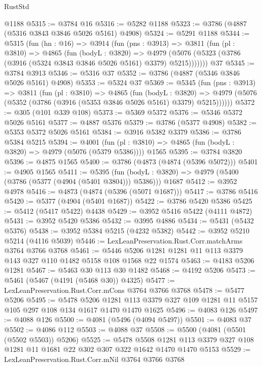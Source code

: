 \begin{lexlean}{RustStd}
\begin{coremodule}
    @1188
@5315 := @3784 @16
@5316 := @5282 @1188
@5323 := @3786 (@4887 (@5316 @3843 @3846 @5026 @5161) @4908)
@5324 := @5291 @1188
@5344 := @5315
    (fun (hn : @16) =>
    @3914
      (fun (pns : @3913) =>
      @3811
        (fun (pl : @3810) =>
        @4865
          (fun (bodyL : @3820) =>
          @4979 (@5076 (@5323 (@3786 (@3916 (@5324 @3843 @3846 @5026 @5161) @3379) @5215)))))))
    @37
@5345 := @3784 @3913
@5346 := @5316 @37
@5352 := @3786 (@4887 (@5346 @3846 @5026 @5161) @4908)
@5353 := @5324 @37
@5369 := @5345
    (fun (pns : @3913) =>
    @3811
      (fun (pl : @3810) =>
      @4865
        (fun (bodyL : @3820) =>
        @4979 (@5076 (@5352 (@3786 (@3916 (@5353 @3846 @5026 @5161) @3379) @5215))))))
@5372 := @305 (@101 @339 @108)
@5373 := @5369 @5372
@5376 := @5346 @5372 @5026 @5161
@5377 := @4887 @5376
@5379 := @3786 (@5377 @4908)
@5382 := @5353 @5372 @5026 @5161
@5384 := @3916 @5382 @3379
@5386 := @3786 @5384 @5215
@5394 := @4001
    (fun (pl : @3810) => @4865 (fun (bodyL : @3820) => @4979 (@5076 (@5379 @5386))))
    @1565
@5395 := @3784 @3820
@5396 := @4875 @1565
@5400 := @3786 (@4873 (@4874 (@5396 @5072)))
@5401 := @4905 @1565
@5411 := @5395
    (fun (bodyL : @3820) => @4979 (@5400 (@3786 (@5377 (@4904 (@5401 @3804))) @5386)))
    @1687
@5412 := @3952 @4978
@5416 := @4873 (@4874 (@5396 (@5071 @1687)))
@5417 := @3786 @5416
@5420 := @5377 (@4904 (@5401 @1687))
@5422 := @3786 @5420 @5386
@5425 := @5412 (@5417 @5422) @4438
@5429 := @3952 @5416 @5422 (@4111 @4872)
@5431 := @3952 @5420 @5386
@5432 := @3995 @4886
@5434 := @5431 (@5432 @5376)
@5438 := @3952 @5384 @5215 (@4232 @5382)
@5442 := @3952 @5210 @5214 (@4116 @5039)
@5446 := LexLeanPreservation.Rust.Corr.matchArms @3764 @3766 @3768
@5461 := @5446 @5206 @1281 @1281 @11 @113 @3379 @143 @327 @110 @1482 @5158 @108 @1568 @22 @1574
@5463 := @4183 @5206 @1281
@5467 := @5463 @30 @113 @30 @1482
@5468 := @4192 @5206
@5473 := @5461 (@5467 (@4191 (@5468 @30)) @4325)
@5477 := LexLeanPreservation.Rust.Corr.mCons @3764 @3766 @3768
@5478 := @5477 @5206
@5495 := @5478
    @5206
    @1281
    @113
    @3379
    @327
    @109
    @1281
    @11
    @5157
    @105
    @297
    @108
    @134
    @1617
    @1470
    @1470
    @1625
@5496 := @4083 @126
@5497 := @4088 @126
@5500 := @4081 (@5496 (@4094 @5497))
@5501 := @4083 @37
@5502 := @4086 @112
@5503 := @4088 @37
@5508 := @5500 (@4081 (@5501 (@5502 @5503)) @5206)
@5525 := @5478
    @5508
    @1281
    @113
    @3379
    @327
    @108
    @1281
    @11
    @1681
    @22
    @302
    @307
    @322
    @1642
    @1470
    @1470
    @5153
@5529 := LexLeanPreservation.Rust.Corr.mNil @3764 @3766 @3768

\end{coremodule}
\end{lexlean}
